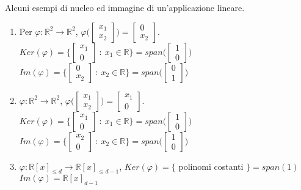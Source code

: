 \begin{example}
Alcuni esempi di nucleo ed immagine di un'applicazione lineare.
\begin{enumerate}
    \item Per $\varphi: \mathbb{R}^2 \to \mathbb{R}^2$, $\varphi\Bigg(\begin{bmatrix}x_1\\x_2\end{bmatrix}\Bigg) = \begin{bmatrix}0\\x_2\end{bmatrix}$.\\
    $Ker(\varphi) = \{\begin{bmatrix}x_1\\0\end{bmatrix} \::\: x_1 \in \mathbb{R}\} = span\Bigg(\begin{bmatrix}1\\0\end{bmatrix}\Bigg)$ \hspace{.3cm} $Im(\varphi) = \{\begin{bmatrix}0\\x_2\end{bmatrix} \::\: x_2 \in \mathbb{R}\} = span\Bigg(\begin{bmatrix}0\\1\end{bmatrix}\Bigg)$
    \item $\varphi: \mathbb{R}^2 \to \mathbb{R}^2$, $\varphi\Bigg(\begin{bmatrix}x_1\\x_2\end{bmatrix}\Bigg) = \begin{bmatrix}x_1\\0\end{bmatrix}$.\\
    $Ker(\varphi) = \{\begin{bmatrix}x_1\\0\end{bmatrix} \::\: x_1 \in \mathbb{R}\} = span\Bigg(\begin{bmatrix}1\\0\end{bmatrix}\Bigg)$ \hspace{.3cm} $Im(\varphi) = \{\begin{bmatrix}x_2\\0\end{bmatrix} \::\: x_2 \in \mathbb{R}\} = span\Bigg(\begin{bmatrix}1\\0\end{bmatrix}\Bigg)$
    \item $\varphi: \mathbb{R}[x]_{\leq d} \to \mathbb{R}[x]_{\leq d-1}$, $Ker(\varphi) = \{$ polinomi costanti $\} = span(1)$ \hspace{.3cm} $Im(\varphi) = \mathbb{R}[x]_{d-1}$
\end{enumerate}
\end{example}

